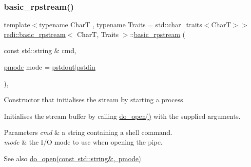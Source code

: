 \subsubsection{\texorpdfstring{basic\+\_\+rpstream()}{basic\_rpstream()}\hspace{0.1cm}{\footnotesize\ttfamily [1/3]}}
{\footnotesize\ttfamily template$<$typename CharT , typename Traits  = std\+::char\+\_\+traits$<$\+Char\+T$>$$>$ \\
\mbox{\hyperlink{classredi_1_1basic__rpstream}{redi\+::basic\+\_\+rpstream}}$<$ CharT, Traits $>$\+::\mbox{\hyperlink{classredi_1_1basic__rpstream}{basic\+\_\+rpstream}} (\begin{DoxyParamCaption}\item[{const std\+::string \&}]{cmd,  }\item[{\mbox{\hyperlink{structredi_1_1pstreams_a1eae4aad88812af03a0fbb3ec13c50b7}{pmode}}}]{mode = {\ttfamily \mbox{\hyperlink{structredi_1_1pstreams_ad3c6d53a98de4566478b1c40c101a42b}{pstdout}}$\vert$\mbox{\hyperlink{structredi_1_1pstreams_a7a976ce992db857f86a0cc3352e42d3a}{pstdin}}} }\end{DoxyParamCaption})\hspace{0.3cm}{\ttfamily [inline]}, {\ttfamily [explicit]}}



Constructor that initialises the stream by starting a process. 

Initialises the stream buffer by calling \mbox{\hyperlink{classredi_1_1pstream__common_a2505ab3e3a834b92d98b5bcb97734dfe}{do\+\_\+open()}} with the supplied arguments.


\begin{DoxyParams}{Parameters}
{\em cmd} & a string containing a shell command. \\
\hline
{\em mode} & the I/O mode to use when opening the pipe. \\
\hline
\end{DoxyParams}
\begin{DoxySeeAlso}{See also}
\mbox{\hyperlink{classredi_1_1pstream__common_a2505ab3e3a834b92d98b5bcb97734dfe}{do\+\_\+open(const std\+::string\&, pmode)}} 
\end{DoxySeeAlso}
\mbox{\label{classredi_1_1basic__rpstream_ae8bae1d56f8f7b8051d454d3ec7545f5}} 
